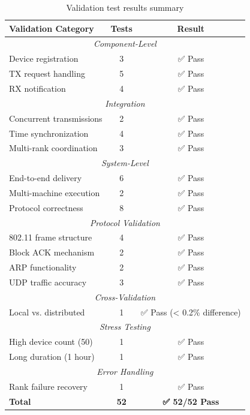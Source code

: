 \begin{table}[htbp]
\centering
\caption{Validation test results summary}
\label{tab:validation-summary}
\small
\begin{tabular}{@{}lcc@{}}
\toprule
\textbf{Validation Category} & \textbf{Tests} & \textbf{Result} \\
\midrule
\multicolumn{3}{c}{\textit{Component-Level}} \\
Device registration & 3 & ✅ Pass \\
TX request handling & 5 & ✅ Pass \\
RX notification & 4 & ✅ Pass \\
\midrule
\multicolumn{3}{c}{\textit{Integration}} \\
Concurrent transmissions & 2 & ✅ Pass \\
Time synchronization & 4 & ✅ Pass \\
Multi-rank coordination & 3 & ✅ Pass \\
\midrule
\multicolumn{3}{c}{\textit{System-Level}} \\
End-to-end delivery & 6 & ✅ Pass \\
Multi-machine execution & 2 & ✅ Pass \\
Protocol correctness & 8 & ✅ Pass \\
\midrule
\multicolumn{3}{c}{\textit{Protocol Validation}} \\
802.11 frame structure & 4 & ✅ Pass \\
Block ACK mechanism & 2 & ✅ Pass \\
ARP functionality & 2 & ✅ Pass \\
UDP traffic accuracy & 3 & ✅ Pass \\
\midrule
\multicolumn{3}{c}{\textit{Cross-Validation}} \\
Local vs. distributed & 1 & ✅ Pass (< 0.2\% difference) \\
\midrule
\multicolumn{3}{c}{\textit{Stress Testing}} \\
High device count (50) & 1 & ✅ Pass \\
Long duration (1 hour) & 1 & ✅ Pass \\
\midrule
\multicolumn{3}{c}{\textit{Error Handling}} \\
Rank failure recovery & 1 & ✅ Pass \\
\midrule
\textbf{Total} & \textbf{52} & \textbf{✅ 52/52 Pass} \\
\bottomrule
\end{tabular}
\end{table}

